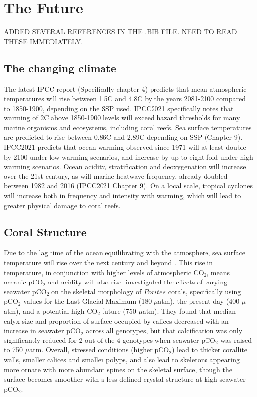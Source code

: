 \documentclass[11pt,a4paper]{article}
\begin{document}
\section{The Future}

ADDED SEVERAL REFERENCES IN THE .BIB FILE. NEED TO READ THESE IMMEDIATELY.

\subsection{The changing climate}

The latest IPCC report \citep{IPCC2021WG1} (Specifically chapter 4) predicts that mean atmospheric temperatures will rise between 1.5\textdegree C and 4.8\textdegree C by the years  2081-2100 compared to 1850-1900, depending on the SSP used. IPCC2021 specifically notes that warming of 2\textdegree C above 1850-1900 levels will exceed hazard thresholds for many marine organisms and ecosystems, including coral reefs. Sea surface temperatures are predicted to rise between 0.86\textdegree C and 2.89\textdegree C depending on SSP (Chapter 9). IPCC2021 predicts that ocean warming observed since 1971 will at least double by 2100 under low warming scenarios, and increase by up to eight fold under high warming scenarios. Ocean acidity, stratification and deoxygenation will increase over the 21st century, as will marine heatwave frequency, already doubled between 1982 and 2016 (IPCC2021 Chapter 9). On a local scale, tropical cyclones will increase both in frequency and intensity with warming, which will lead to greater physical damage to coral reefs. 






\subsection{Coral Structure}

Due to the lag time of the ocean equilibrating with the atmosphere, sea surface temperature will rise over the next century and beyond \citep{IPCC2021WG1}. This rise in temperature, in conjunction with higher levels of atmospheric CO$_{2}$, means oceanic pCO$_{2}$ and acidity will also rise. \cite{Allison2022} investigated the effects of varying seawater pCO$_{2}$ on the skeletal morphology of $\textit{Porites}$ corals, specifically  using pCO$_{2}$ values for the Last Glacial Maximum (180 $\mu$atm), the present day (400 $\mu$atm), and a potential high CO$_{2}$ future (750 $\mu$atm). They found that median calyx size and proportion of surface occupied by calices decreased with an increase in seawater pCO$_{2}$ across all genotypes, but that calcification was only significantly reduced for 2 out of the 4 genotypes when seawater pCO$_{2}$ was raised to 750 $\mu$atm. Overall, stressed conditions (higher pCO$_{2}$) lead to thicker corallite walls, smaller calices and smaller polyps, and also lead to skeletons appearing more ornate with more abundant spines on the skeletal surface, though the surface becomes smoother with a less defined crystal structure at high seawater pCO$_{2}$.
\end{document}
